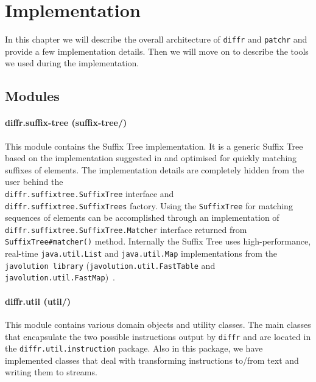 \section{Implementation}

In this chapter we will describe the overall architecture of \texttt{diffr} and \texttt{patchr} and provide a few implementation details. Then we will move on to describe the tools we used during the implementation.

\subsection{Modules}

\paragraph{diffr.suffix-tree (suffix-tree/)}
This module contains the Suffix Tree implementation. It is a generic Suffix Tree based on the implementation suggested in \cite{Ukkonen95} and optimised for quickly matching suffixes of elements. The implementation details are completely hidden from the user behind the \\ \texttt{diffr.suffixtree.SuffixTree} interface and \\ \texttt{diffr.suffixtree.SuffixTrees} factory. Using the \texttt{SuffixTree} for matching sequences of elements can be accomplished through an implementation of \texttt{diffr.suffixtree.SuffixTree.Matcher} interface returned from \\ \texttt{SuffixTree\#matcher()} method. Internally the Suffix Tree uses high-performance, real-time \texttt{java.util.List} and \texttt{java.util.Map} implementations from the \texttt{javolution library} (\texttt{javolution.util.FastTable} and \texttt{javolution.util.FastMap})~\cite{javolution}. 

\paragraph{diffr.util (util/)}
This module contains various domain objects and utility classes. The main classes that encapsulate the two possible instructions output by \texttt{diffr} and are located in the \texttt{diffr.util.instruction} package. Also in this package, we have implemented classes that deal with transforming instructions to/from text and writing them to streams.


